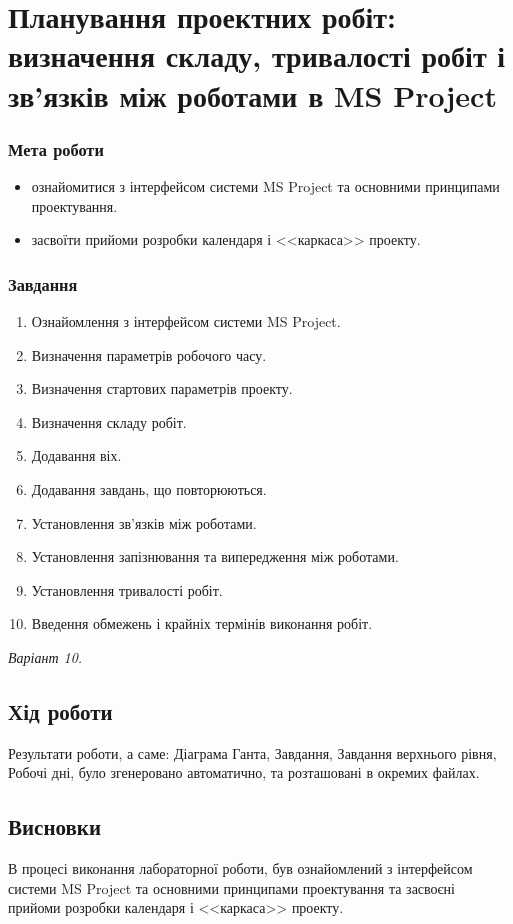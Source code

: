 



\newcommand{\labnumber}{1} %



\graphicspath{{figures/}}


\Ukrainian


\addtocounter{page}{1}

\section*{Планування проектних робіт: визначення складу, тривалості робіт і зв'язків між роботами в MS Project}
\subsubsection*{Мета роботи}
\begin{itemize}
	\item ознайомитися з інтерфейсом системи MS Project та основними принципами проектування.
	\item засвоїти прийоми розробки календаря і <<каркаса>> проекту.
\end{itemize}

\subsubsection*{Завдання}
\begin{enumerate}
  	\item Ознайомлення з інтерфейсом системи MS Project.
  	\item Визначення параметрів робочого часу.
  	\item Визначення стартових параметрів проекту.
  	\item Визначення складу робіт.
  	\item Додавання віх.
  	\item Додавання завдань, що повторюються.
  	\item Установлення зв’язків між роботами.
  	\item Установлення запізнювання та випередження між роботами.
  	\item Установлення тривалості робіт.
  	\item Введення обмежень і крайніх термінів виконання робіт.
\end{enumerate}

\textit{Варіант 10.}

\subsection*{Хід роботи}
Результати роботи, а саме: Діаграма Ганта, Завдання, Завдання верхнього рівня, Робочі дні, було згенеровано автоматично, та розташовані в
окремих файлах.

\subsection*{Висновки}
В процесі виконання лабораторної роботи, був
ознайомлений з інтерфейсом системи MS Project та основними принципами проектування та засвоєні прийоми розробки календаря і <<каркаса>> проекту.



